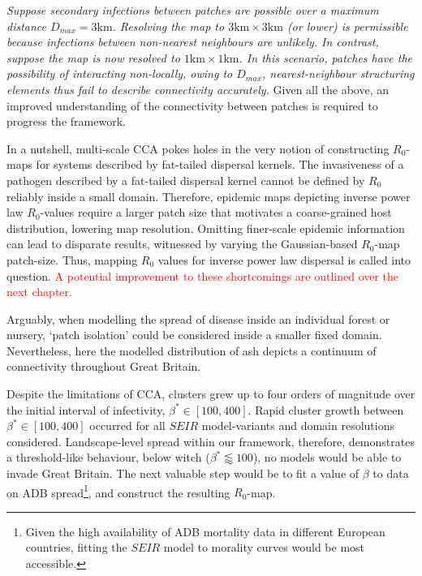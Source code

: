 \textit{Suppose secondary infections between patches are possible over a maximum distance $D_{max} = 3\mathrm{km}$.
Resolving the map to $\mathrm{3km \times 3km}$ (or lower) is permissible because infections between non-nearest neighbours are unlikely.
In contrast, suppose the map is now resolved to $\mathrm{1km \times 1km}$.
In this scenario, patches have the possibility of interacting non-locally, owing to $D_{max}$, nearest-neighbour structuring elements thus fail to describe connectivity accurately.}
Given all the above, an improved understanding of the connectivity between patches is required to progress the framework.

In a nutshell, multi-scale CCA pokes holes in the very notion of constructing $R_0$-maps for systems described by fat-tailed dispersal kernels.
The invasiveness of a pathogen described by a fat-tailed dispersal kernel cannot be defined by $R_0$ reliably inside a small domain.
Therefore, epidemic maps depicting inverse power law $R_0$-values require a larger patch size that motivates a coarse-grained host distribution, lowering map resolution.
Omitting finer-scale epidemic information can lead to disparate results, witnessed by varying the Gaussian-based $R_0$-map patch-size.
Thus, mapping $R_0$ values for inverse power law dispersal is called into question.
\textcolor{red}{A potential improvement to these shortcomings are outlined over the next chapter.}

Arguably, when modelling the spread of disease inside an individual forest or nursery, `patch isolation' could be considered inside a smaller fixed domain.
Nevertheless, here the modelled distribution of ash depicts a continuum of connectivity throughout Great Britain.

Despite the limitations of CCA, clusters grew up to four orders of magnitude over the initial interval of infectivity, $\beta^*\in [100, 400]$.
Rapid cluster growth between $\beta^*\in [100, 400]$ occurred for all $SEIR$ model-variants and domain resolutions considered.
Landscape-level spread within our framework, therefore, demonstrates a threshold-like behaviour, below witch ($\beta^* \lessapprox 100$), no models would be able to invade Great Britain.
The next valuable step would be to fit a value of $\beta$ to data on ADB spread\footnote{Given the high availability of ADB mortality data in different European countries, fitting the $SEIR$ model to morality curves would be most accessible.}, 
and construct the resulting $R_0$-map.



